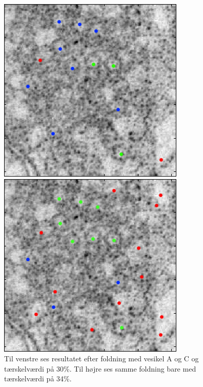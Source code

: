 \begin{figure}[H]
	\begin{minipage}[b]{0.5\linewidth}
		\includegraphics[scale=0.65]{files/postmethod/img/ves1+2_th-30_res2.png}
	\end{minipage}
	\hspace{0.5cm}
	\begin{minipage}[b]{0.5\linewidth}
		\includegraphics[scale=0.65]{files/postmethod/img/ves1+2_th-34_res2.png}
	\end{minipage}
	\caption{Til venstre ses resultatet efter foldning med vesikel A og C og tærskelværdi på 30\%. Til højre ses samme foldning bare med tærskelværdi på 34\%.\label{fig:postmethod_conv_ves_1}}
\end{figure}


